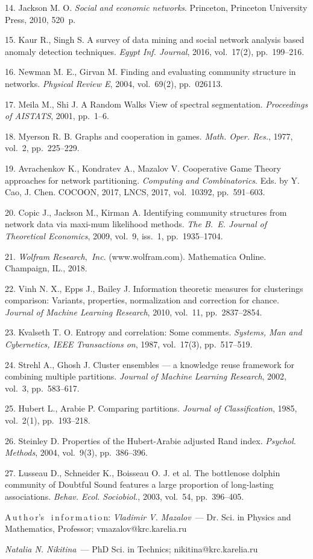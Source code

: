 {14. Jackson M. O. \textit{Social and economic networks}.
Princeton, Princeton University Press, 2010, 520~p.

15. Kaur R., Singh S. A survey of data mining and social network
analysis based anomaly detection techniques. \textit{Egypt Inf.
Journal}, 2016, vol.~17(2), pp.~199--216.

16. Newman M. E., Girvan M. Finding and evaluating community
structure in networks. \textit{Physical Review E}, 2004,
vol.~69(2), pp.~026113.

17. Meila M., Shi J. A Random Walks View of spectral segmentation.
\textit{Proceedings of AISTATS}, 2001, pp.~1--6.

18. Myerson R. B. Graphs and cooperation in games. \textit{Math.
Oper. Res.}, 1977, vol.~2, pp.~225--229.

19. Avrachenkov K., Kondratev A., Mazalov V. Cooperative Game
Theory approaches for network partitioning. \textit{Computing and
Combinatorics}. Eds. by Y. Cao, J. Chen. COCOON, 2017, LNCS, 2017,
vol.~10392, pp.~591--603.

20. Copic J., Jackson M., Kirman A. Identifying community
structures from network data via maxi-\linebreak mum likelihood
methods. \textit{The B.~E. Journal of Theoretical Economics},
2009, vol.~9, iss.~1, pp.~1935--1704.

21. {\it Wolfram Research$,$ Inc}. (www.wolfram.com). Mathematica
Online. Champaign, IL., 2018.

22. Vinh N. X., Epps J., Bailey J. Information theoretic measures
for clusterings comparison: Variants, properties, normalization
and correction for chance. \textit{Journal of Machine Learning
Research}, 2010, vol.~11, pp.~2837--2854.

23. Kvalseth T. O. Entropy and correlation: Some comments.
\textit{Systems, Man and Cybernetics, IEEE Transactions on}, 1987,
vol.~17(3), pp.~517--519.

24. Strehl A., Ghosh J. Cluster ensembles --- a knowledge reuse
framework for combining multiple partitions. \textit{Journal of
Machine Learning Research}, 2002, vol.~3, pp.~583--617.

25. Hubert L., Arabie P. Comparing partitions. \textit{Journal of
Classification}, 1985, vol.~2(1), pp.~193--218.

26. Steinley D. Properties of the Hubert-Arabie adjusted Rand
index. \textit{Psychol. Methods}, 2004, vol.~9(3), pp.~386--396.

27. Lusseau D., Schneider K., Boisseau O. J. et al. The bottlenose
dolphin community of Doubtful Sound features a large proportion of
long-lasting associations. \textit{Behav. Ecol. Sociobiol.}, 2003,
vol.~54, pp.~396--405.



\vskip6mm A\,u\,t\,h\,o\,r's \ i\,n\,f\,o\,r\,m\,a\,t\,i\,o\,n:
\vskip2mm \textit{Vladimir V. Mazalov}~--- Dr. Sci. in Physics and
Mathematics, Professor; vmazalov@krc.karelia.ru

\vskip2mm \textit{Natalia N. Nikitina}~--- PhD Sci. in Technics;
nikitina@krc.karelia.ru
\par}
